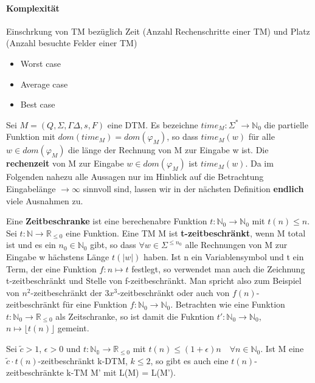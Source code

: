 \paragraph*{Komplexität} 
    Einschrkung von TM bezüglich Zeit (Anzahl Rechenschritte einer TM) und Platz (Anzahl besuchte Felder einer TM)
    \begin{itemize}
        \item Worst case
        \item Average case
        \item Best case
    \end{itemize}

    Sei \(M = (Q, \Sigma, \Gamma \Delta, s, F)\) eine DTM. Es bezeichne \(time_M:\Sigma^* \to \mathbb{N}_0\) die partielle Funktion mit \(dom(time_M) = dom (\varphi_M)\), so dass \(time_M(w)\) für alle \(w \in dom (\varphi_M)\) die länge der Rechnung von M zur Eingabe w ist. Die \textbf{rechenzeit} von M zur Eingabe \(w \in dom (\varphi_M)\) ist \(time_M(w)\). 
    \medskip
    Da im Folgenden nahezu alle Aussagen nur im Hinblick auf die Betrachtung Eingabelänge \(\to \infty\) sinnvoll sind, lassen wir in der nächsten Definition \textbf{endlich} viele Ausnahmen zu.

    Eine \textbf{Zeitbeschranke} ist eine berechenabre Funktion \(t: \mathbb{N}_0 \to \mathbb{N}_0\) mit \(t(n)\leq n\). Sei \(t: \mathbb{N}\to \mathbb{R}_{\leq 0}\) eine Funktion. Eine TM M ist \textbf{t-zeitbeschränkt}, wenn M total ist und es ein \(n_0 \in \mathbb{N}_0\) gibt, so dass \(\forall w \in \Sigma^{\leq n_0}\) alle Rechnungen von M zur Eingabe w hächstens Länge \(t(|w|)\) haben.
    \medskip
    Ist n ein Variablensymbol und t ein Term, der eine Funktion \(f: n \mapsto t\) festlegt, so verwendet man auch die Zeichnung t-zeitbeschränkt und Stelle von f-zeitbeschränkt. Man spricht also zum Beispiel von \(n^2\)-zeitbeschränkt der \(3x^3\)-zeitbeschränkt oder auch von \(f(n)\)-zeitbeschränkt für eine Funktion \(f: \mathbb{N}_0 \to \mathbb{N}_0\). Betrachten wie eine Funktion \(t: \mathbb{N}_0 \to \mathbb{R}_{\leq 0}\) als Zeitschranke, so ist damit die Fukntion \(t': \mathbb{N}_0 \to \mathbb{N}_0\), \(n \mapsto \lfloor t(n)\rfloor\) gemeint.

    Sei \(\tilde{c} > 1\), \(\epsilon > 0\) und \(t: \mathbb{N_0} \to \mathbb{R}_{\leq 0}\) mit \(t(n) \leq (1+ \epsilon)n \quad \forall n \in \mathbb{N}_0\). Ist M eine \(\tilde{c}\cdot t(n)\)-zeitbeschränkt k-DTM, \(k \leq 2\), so gibt es auch eine \(t(n)\)-zeitbeschränkte k-TM M' mit L(M) = L(M').

